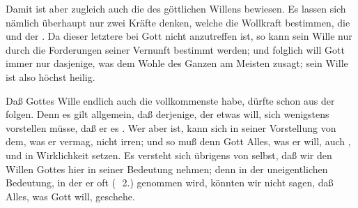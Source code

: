\begin{aufza}
\begin{aufzb}
\item Damit ist aber zugleich auch die  des göttlichen Willens bewiesen. Es lassen sich nämlich überhaupt nur zwei Kräfte denken, welche die Wollkraft bestimmen, die  und der . Da dieser letztere bei Gott nicht anzutreffen ist, so kann sein Wille nur durch die Forderungen seiner Vernunft bestimmt werden; und folglich will Gott immer nur dasjenige, was dem Wohle des Ganzen am Meisten zusagt; sein Wille ist also höchst heilig.
\item Daß Gottes Wille endlich auch die vollkommenste  habe, dürfte schon aus der  folgen. Denn es gilt allgemein, daß derjenige, der etwas will, sich wenigstens vorstellen müsse, daß er es . Wer aber  ist, kann sich in seiner Vorstellung von dem, was er vermag, nicht irren; und so muß denn Gott Alles, was er will, auch , und in Wirklichkeit setzen. Es versteht sich übrigens von selbst, daß wir den Willen Gottes hier in seiner  Bedeutung nehmen; denn in der uneigentlichen Bedeutung, in der er oft (\ \no\,2.) genommen wird, könnten wir nicht sagen, daß Alles, was Gott will, geschehe.~
\end{aufzb}
\end{aufza}

